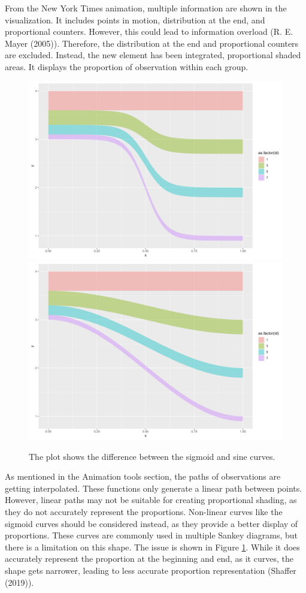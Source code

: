 From the New York Times animation, multiple information are shown in the visualization. It includes points in motion, distribution at the end, and proportional counters. However, this could lead to information overload (R. E. Mayer (2005)). Therefore, the distribution at the end and proportional counters are excluded. Instead, the new element has been integrated, proportional shaded areas. It displays the proportion of observation within each group.

\begin{figure}
\includegraphics[width=0.5\linewidth]{figures/sigmoid-shade} \includegraphics[width=0.5\linewidth]{figures/sine-shade} \caption{The plot shows the difference between the sigmoid and sine curves.}\label{fig:proportional-shade}
\end{figure}

As mentioned in the Animation tools section, the paths of observations are getting interpolated. These functions only generate a linear path between points. However, linear paths may not be suitable for creating proportional shading, as they do not accurately represent the proportions. Non-linear curves like the sigmoid curves should be considered instead, as they provide a better display of proportions. These curves are commonly used in multiple Sankey diagrams, but there is a limitation on this shape. The issue is shown in Figure \ref{fig:proportional-shade}. While it does accurately represent the proportion at the beginning and end, as it curves, the shape gets narrower, leading to less accurate proportion representation (Shaffer (2019)).

